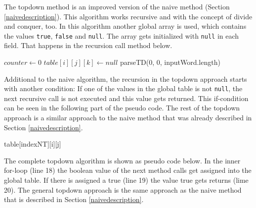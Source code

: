 \documentclass[a4paper, 11pt]{article}
\begin{document}

The topdown method is an improved version of the naive method (Section \ref{naivedescription}). This algorithm works recursive and with the concept of divide and conquer, too. In this algorithm another global array is used, which contains the values \texttt{true}, \texttt{false} and \texttt{null}. The array gets initialized with \texttt{null} in each field. That happens in the recursion call method below.

\begin{center}
\begin{algorithmic}[1]
\State $counter \gets 0$
\State $table[i][j][k] \gets null$
\EndFor
\EndFor
\EndFor
\State \Return parseTD(0, 0, inputWord.length)
\end{algorithmic}
\hrulefill
\end{center}

Additional to the naive algorithm, the recursion in the topdown approach starts with another condition: If one of the values in the global table is not \texttt{null}, the next recursive call is not executed and this value gets returned. This if-condition can be seen in the following part of the pseudo code. The rest of the topdown approach is a similar approach to the naive method that was already described in Section \ref{naivedescription}.

\begin{center}
\begin{algorithmic}[1]
\State \Return table[indexNT][i][j]
\EndIf
\end{algorithmic}
\hrulefill
\end{center}

The complete topdown algorithm is shown as pseudo code below. In the inner for-loop (line 18) the boolean value of the next method calls get assigned into the global table. If there is assigned a true (line 19) the value true gets returns (lime 20). The general topdown approach is the same approach as the naive method that is described in Section \ref{naivedescription}.
\end{document}
